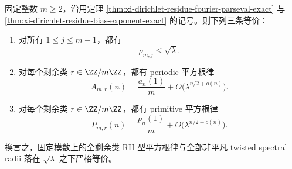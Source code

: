 \begin{theorem}\label{thm:xi-dirichlet-residue-sqrtlaw-twist-equivalence}
固定整数 \(m\ge 2\)，沿用定理 \ref{thm:xi-dirichlet-residue-fourier-parseval-exact} 与
\ref{thm:xi-dirichlet-residue-bias-exponent-exact} 的记号。则下列三条等价：
\begin{enumerate}
  \item 对所有 \(1\le j\le m-1\)，都有
  \[
  \rho_{m,j}\le \sqrt{\lambda}.
  \]
  \item 对每个剩余类 \(r\in\ZZ/m\ZZ\)，都有 periodic 平方根律
  \[
  A_{m,r}(n)=\frac{a_n(1)}{m}+O\!\bigl(\lambda^{n/2+o(n)}\bigr).
  \]
  \item 对每个剩余类 \(r\in\ZZ/m\ZZ\)，都有 primitive 平方根律
  \[
  P_{m,r}(n)=\frac{p_n(1)}{m}+O\!\bigl(\lambda^{n/2+o(n)}\bigr).
  \]
\end{enumerate}
换言之，固定模数上的全剩余类 RH 型平方根律与全部非平凡 twisted spectral radii 落在 \(\sqrt{\lambda}\) 之下严格等价。
\end{theorem}
